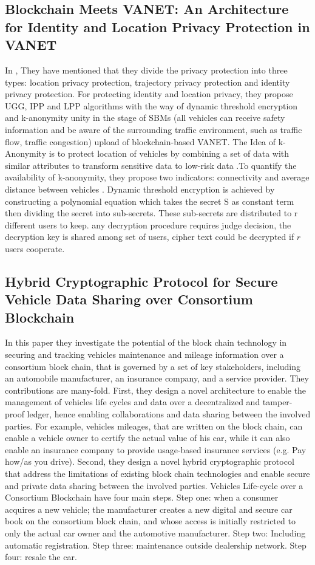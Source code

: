 			\subsection{Blockchain Meets VANET: An Architecture for Identity and Location Privacy Protection in VANET \cite{paper12}}
			In \cite{paper12}, They have mentioned that they divide the privacy protection into three types: location
			privacy protection, trajectory privacy protection and identity privacy protection. For protecting identity and location privacy, they propose UGG, IPP and LPP algorithms with the way of dynamic threshold encryption and k-anonymity unity in the stage of SBMs (all vehicles can receive safety information and be aware of the surrounding traffic environment, such as traffic flow, traffic congestion) upload of blockchain-based VANET. The Idea of k-Anonymity is to protect location of vehicles by combining a set of data with similar attributes to transform sensitive data to low-risk data .To quantify the availability of k-anonymity, they propose two indicators: connectivity and average distance between vehicles . Dynamic threshold encryption is achieved by constructing a polynomial equation which takes the secret S as constant term then dividing the secret into sub-secrets. These sub-secrets are distributed to r different users to keep. any decryption procedure requires judge decision, the decryption key is shared among set of users, cipher text could be decrypted if $r$ users cooperate. 
			\subsection{Hybrid Cryptographic Protocol for Secure Vehicle Data Sharing over Consortium Blockchain \cite{paper13}}
			In this paper they investigate the potential of the block chain technology in securing and tracking vehicles maintenance and mileage information over a consortium block chain, that is governed by a set of key stakeholders, including an automobile manufacturer, an insurance company, and a service provider. They contributions are many-fold. First, they design a novel architecture to enable the management of vehicles life cycles and data over a decentralized and tamper-proof ledger, hence enabling collaborations and data sharing between the involved parties. For example, vehicles mileages, that are written on the block chain, can enable a vehicle owner to certify the actual value of his car, while it can also enable an insurance company to provide usage-based insurance services (e.g. Pay how/as you drive). Second, they design a novel hybrid cryptographic protocol that address the limitations of existing block chain technologies and enable secure and private data sharing between the involved parties. Vehicles Life-cycle over a Consortium Blockchain have four main steps. Step one: when a consumer acquires a new vehicle; the manufacturer creates a new digital and secure car book on the consortium block chain, and whose access is initially restricted to only the actual car owner and the automotive manufacturer. Step two: Including automatic registration. Step three: maintenance outside dealership network. Step four: resale the car. 
